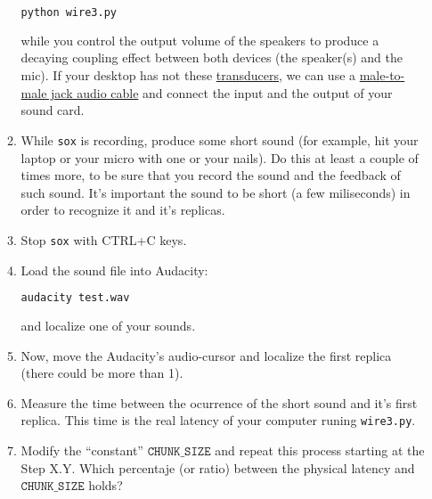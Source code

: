 \begin{enumerate}
\begin{enumerate}
    \begin{lstlisting}[language=Bash]
      python wire3.py
    \end{lstlisting}

    while you control the output volume of the speakers to produce a
    decaying coupling effect between both devices (the speaker(s) and
    the mic). If your desktop has not
    these \href{https://en.wikipedia.org/wiki/Transducer}{transducers},
    we can use
    a \href{https://www.google.com/search?q=male+to+male+audio+jack+cable&client=firefox-b-d&sxsrf=ALeKk00GZUDGqiOfc0D8xkA_MIYgCuZmSA:1600270049146&source=lnms&tbm=isch&sa=X&ved=2ahUKEwjdvsu-_u3rAhXl0eAKHS90DUoQ_AUoAXoECA0QAw&biw=4288&bih=972}{male-to-male
    jack audio cable} and connect the input and the output of your
    sound card.

  \item While \texttt{sox} is recording, produce some short sound (for
    example, hit your laptop or your micro with one or your nails). Do
    this at least a couple of times more, to be sure that you record
    the sound and the feedback of such sound. It's important the sound
    to be short (a few miliseconds) in order to recognize it and it's
    replicas.

  \item Stop \texttt{sox} with CTRL+C keys.

  \item Load the sound file into Audacity:
    
    \begin{lstlisting}[language=Bash]
      audacity test.wav
    \end{lstlisting}

    and localize one of your sounds.

  \item Now, move the Audacity's audio-cursor and localize the first
    replica (there could be more than 1).

  \item Measure the time between the ocurrence of the short sound and
    it's first replica. This time is the real latency of your computer
    runing \texttt{wire3.py}.

  \item Modify the ``constant'' $\mathtt{CHUNK\_SIZE}$ and repeat this
    process starting at the Step X.Y. Which percentaje (or ratio)
    between the physical latency and $\mathtt{CHUNK\_SIZE}$ holds?

  \end{enumerate}


\end{enumerate}
